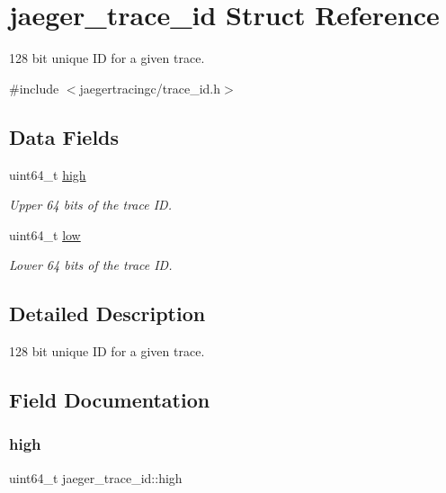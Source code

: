 \hypertarget{structjaeger__trace__id}{}\section{jaeger\+\_\+trace\+\_\+id Struct Reference}
\label{structjaeger__trace__id}


128 bit unique ID for a given trace.  




{\ttfamily \#include $<$jaegertracingc/trace\+\_\+id.\+h$>$}

\subsection*{Data Fields}
\begin{DoxyCompactItemize}
\item 
uint64\+\_\+t \mbox{\hyperlink{structjaeger__trace__id_a9dd33226f6827ef126be0857416f7043}{high}}
\begin{DoxyCompactList}\small\item\em Upper 64 bits of the trace ID. \end{DoxyCompactList}\item 
uint64\+\_\+t \mbox{\hyperlink{structjaeger__trace__id_af6a2c57fe8c53b8a1dbe114a757ab3b7}{low}}
\begin{DoxyCompactList}\small\item\em Lower 64 bits of the trace ID. \end{DoxyCompactList}\end{DoxyCompactItemize}


\subsection{Detailed Description}
128 bit unique ID for a given trace. 



\subsection{Field Documentation}
\mbox{\label{structjaeger__trace__id_a9dd33226f6827ef126be0857416f7043}} 
\subsubsection{\texorpdfstring{high}{high}}
{\footnotesize\ttfamily uint64\+\_\+t jaeger\+\_\+trace\+\_\+id\+::high}



